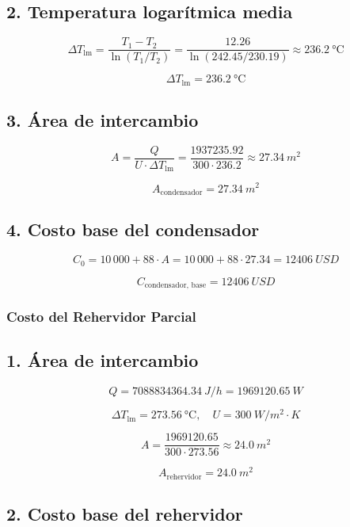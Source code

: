 \subsection*{2. Temperatura logarítmica media}

\[
    \Delta T_{\text{lm}} = \frac{T_1 - T_2}{\ln(T_1 / T_2)}
    = \frac{12.26}{\ln(242.45 / 230.19)}
    \approx \SI{236.2}{\celsius}
\]

\[
    \boxed{\Delta T_{\text{lm}} = \SI{236.2}{\celsius}}
\]

\subsection*{3. Área de intercambio}

\[
    A = \frac{Q}{U \cdot \Delta T_{\text{lm}}}
    = \frac{1937235.92}{300 \cdot 236.2}
    \approx \SI{27.34}{m^2}
\]

\[
    \boxed{A_{\text{condensador}} = \SI{27.34}{m^2}}
\]

\subsection*{4. Costo base del condensador}

\[
    C_0 = 10\,000 + 88 \cdot A = 10\,000 + 88 \cdot 27.34 = \SI{12406}{USD}
\]

\[
    \boxed{C_{\text{condensador, base}} = \SI{12406}{USD}}
\]

\bigskip

\subsubsection{Costo del Rehervidor Parcial}

\subsection*{1. Área de intercambio}

\[
    Q = \SI{7088834364.34}{J/h} = \SI{1969120.65}{W}
\]

\[
    \Delta T_{\text{lm}} = \SI{273.56}{\celsius}, \quad U = \SI{300}{W/m^2 \cdot K}
\]

\[
    A = \frac{1969120.65}{300 \cdot 273.56} \approx \SI{24.0}{m^2}
\]

\[
    \boxed{A_{\text{rehervidor}} = \SI{24.0}{m^2}}
\]

\subsection*{2. Costo base del rehervidor}

